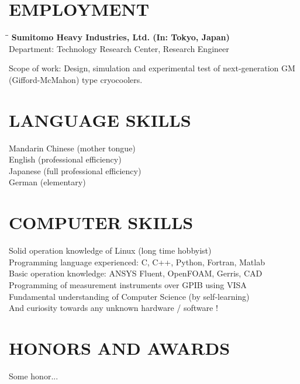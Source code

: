 \documentclass[12pt,A4]{res}
\makeatletter
\newlength\tdima
\newcommand\tabright[1]{%
      \setlength\tdima{\linewidth}%
      \addtolength\tdima{\@totalleftmargin}%
      \addtolength\tdima{-\dimen\@curtab}%
      \makebox[\tdima][r]{#1}}
\makeatother
\begin{document}
\begin{resume}
\section{EMPLOYMENT}
    \vspace{-0.1in}	    
    \begin{tabbing}
    \hspace{2.2in}\= \hspace{2.1in}\= \kill %
    {\bf Sumitomo Heavy Industries, Ltd. (In: Tokyo, Japan)} \> \tabright{2013.4-Present} \\
    Department: Technology Research Center, Research Engineer \\
   \end{tabbing}\vspace{-40pt}      %
   Scope of work: Design, simulation and experimental test of next-generation GM (Gifford-McMahon) type cryocoolers.
   
     
\section{LANGUAGE SKILLS}
Mandarin Chinese (mother tongue) \\
English (professional efficiency) \\
Japanese (full professional efficiency) \\
German (elementary)     

\section{COMPUTER SKILLS}          
Solid operation knowledge of Linux (long time hobbyist) \\
Programming language experienced: C, C++, Python, Fortran, Matlab \\
Basic operation knowledge: ANSYS Fluent, OpenFOAM, Gerris, CAD \\
Programming of measurement instruments over GPIB using VISA \\
Fundamental understanding of Computer Science (by self-learning) \\
And curiosity towards any unknown hardware / software !
 
\section{HONORS AND AWARDS}          
    Some honor... 

\end{resume}
\end{document}
